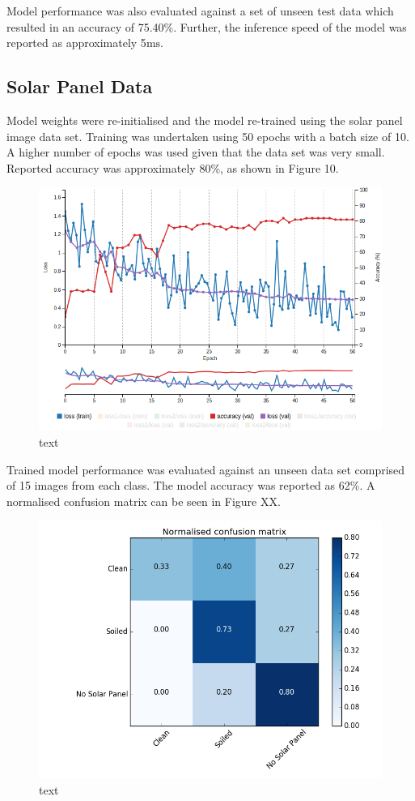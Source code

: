 \documentclass[10pt,journal,compsoc]{IEEEtran}
\begin{document}
		Model performance was also evaluated against a set of unseen test data which resulted in an accuracy of 75.40\%. Further, the inference speed of the model was reported as approximately 5$\si{\milli\second}$.
		
		\subsection{Solar Panel Data}
		Model weights were re-initialised and the model re-trained using the solar panel image data set. Training was undertaken using 50 epochs with a batch size of 10. A higher number of epochs was used given that the data set was very small. Reported accuracy was approximately 80\%, as shown in Figure 10. 
		\begin{figure}[h]
			\centering
			\includegraphics[scale=0.3]{googlenet_train_img}
			\caption{text}
		\end{figure}
		
		Trained model performance was evaluated against an unseen data set comprised of 15 images from each class. The model accuracy was reported as 62\%. A normalised confusion matrix can be seen in Figure XX.
		\begin{figure}[h]
			\centering
			\includegraphics[scale=0.37]{confusion_matrix}
			\caption{text}
		\end{figure}
			
\end{document}
